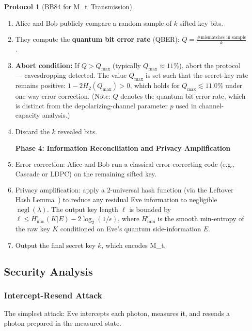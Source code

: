 \documentclass[11pt,a4paper]{article}
\theoremstyle{plain}
\theoremstyle{definition}
\newtheorem{protocol}[theorem]{Protocol}
\theoremstyle{remark}
\DeclareMathOperator{\negl}{negl}
\newcommand{\Mt}{M_t}
\begin{document}
\begin{protocol}[BB84 for \Mt\ Transmission]
\begin{enumerate}[label=1.\arabic*]
  \item Alice and Bob publicly compare a random sample of $k$ sifted key bits.
  \item They compute the \textbf{quantum bit error rate} (QBER):
        $Q = \frac{\text{\# mismatches in sample}}{k}$.
  \item \textbf{Abort condition:} If $Q > Q_{\max}$ (typically
        $Q_{\max} \approx 11\%$), abort the protocol — eavesdropping detected.
        The value $Q_{\max}$ is set such that the secret-key rate remains positive:
        $1 - 2H_2(Q_{\max}) > 0$, which holds for $Q_{\max} \lesssim 11.0\%$
        under one-way error correction. (Note: $Q$ denotes the quantum bit
        error rate, which is distinct from the depolarizing-channel parameter
        $p$ used in channel-capacity analysis.)
  \item Discard the $k$ revealed bits.

  \medskip
  \noindent\textbf{Phase 4: Information Reconciliation and Privacy Amplification}

  \item Error correction: Alice and Bob run a classical error-correcting code
        (e.g., Cascade or LDPC) on the remaining sifted key.
  \item Privacy amplification: apply a 2-universal hash function (via the
        Leftover Hash Lemma~\cite{renner2005}) to reduce any residual Eve
        information to negligible $\negl(\lambda)$. The output key length
        $\ell$ is bounded by
        $\ell \leq H_{\min}^{\epsilon}(K|E) - 2\log_2(1/\epsilon)$,
        where $H_{\min}^{\epsilon}$ is the smooth min-entropy of the raw
        key $K$ conditioned on Eve's quantum side-information $E$.
  \item Output the final secret key $k$, which encodes \Mt.
\end{enumerate}
\end{protocol}

\subsection{Security Analysis}
\label{sec:bb84_security}

\subsubsection{Intercept-Resend Attack}

The simplest attack: Eve intercepts each photon, measures it, and resends a
photon prepared in the measured state.
\end{document}
